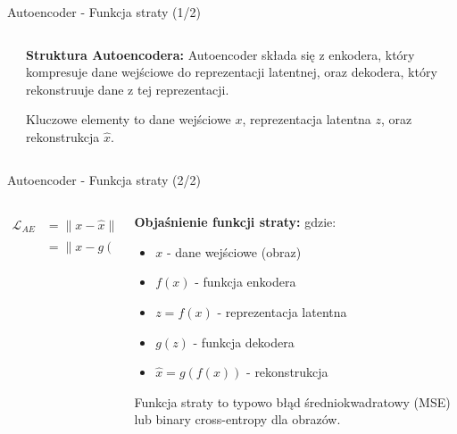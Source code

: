 \documentclass{beamer}
\begin{document}
\begin{frame}{Autoencoder - Funkcja straty (1/2)}
  \begin{columns}
    \begin{column}{0.5\textwidth}
    \end{column}
    \begin{column}{0.5\textwidth}
      \textbf{Struktura Autoencodera:}
      \medskip
      Autoencoder składa się z enkodera, który kompresuje dane wejściowe do reprezentacji latentnej, oraz dekodera, który rekonstruuje dane z tej reprezentacji.
      
      \medskip
      Kluczowe elementy to dane wejściowe $x$, reprezentacja latentna $z$, oraz rekonstrukcja $\hat{x}$.
    \end{column}
  \end{columns}
\end{frame}

\begin{frame}{Autoencoder - Funkcja straty (2/2)}
  \begin{columns}
    \begin{column}{0.5\textwidth}
      \begin{tcolorbox}[colback=yellow!10!white, colframe=black!60, boxrule=0.5pt, arc=3mm]
        \begin{align*}
          \mathcal{L}_{AE} &= \|x - \hat{x}\|^2 \\
          &= \|x - g(f(x))\|^2
        \end{align*}
      \end{tcolorbox}
    \end{column}
    \begin{column}{0.5\textwidth}
      \textbf{Objaśnienie funkcji straty:}
      \medskip
      gdzie:
      \begin{itemize}
        \item $x$ - dane wejściowe (obraz)
        \item $f(x)$ - funkcja enkodera
        \item $z = f(x)$ - reprezentacja latentna
        \item $g(z)$ - funkcja dekodera
        \item $\hat{x} = g(f(x))$ - rekonstrukcja
      \end{itemize}
      
      Funkcja straty to typowo błąd średniokwadratowy (MSE) lub binary cross-entropy dla obrazów.
    \end{column}
  \end{columns}
\end{frame}
\end{document}
